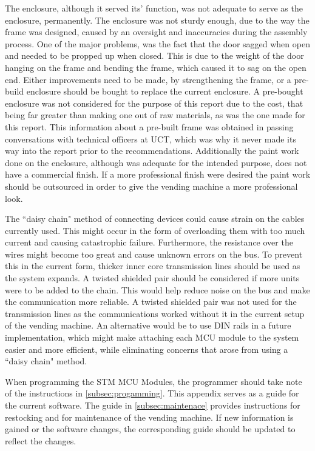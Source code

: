 \documentclass[a4paper,11pt]{article}
\numberwithin{figure}{section}
\numberwithin{table}{section}
\begin{document}
The enclosure, although it served its' function, was not adequate to serve as the enclosure, permanently. The enclosure was not sturdy enough, due to the way the frame was designed, caused by an oversight and inaccuracies during the assembly process. One of the major problems, was the fact that the door sagged when open and needed to be propped up when closed. This is due to the weight of the door hanging on the frame and bending the frame, which caused it to sag on the open end. Either improvements need to be made, by strengthening the frame, or a pre-build enclosure should be bought to replace the current enclosure. A pre-bought enclosure was not considered for the purpose of this report due to the cost, that being far greater than making one out of raw materials, as was the one made for this report. This information about a pre-built frame was obtained in passing conversations with technical officers at UCT, which was why it never made its way into the report prior to the recommendations. Additionally the paint work done on the enclosure, although was adequate for the intended purpose, does not have a commercial finish. If a more professional finish were desired the paint work should be outsourced in order to give the vending machine a more professional look.

The ``daisy chain" method of connecting devices could cause strain on the cables currently used. This might occur in the form of overloading them with too much current and causing catastrophic failure. Furthermore, the resistance over the wires might become too great and cause unknown errors on the bus. To prevent this in the current form, thicker inner core transmission lines should be used as the system expands. A twisted shielded pair should be considered if more units were to be added to the chain. This would help reduce noise on the bus and make the communication more reliable. A twisted shielded pair was not used for the transmission lines as the communications worked without it in the current setup of the vending machine. An alternative would be to use DIN rails in a future implementation, which might make attaching each MCU module to the system easier and more efficient, while eliminating concerns that arose from using a ``daisy chain" method.

When programming the STM MCU Modules, the programmer should take note of the instructions in \autoref{subsec:progamming}. This appendix serves as a guide for the current software. The guide in \autoref{subsec:maintenace} provides instructions for restocking and for maintenance of the vending machine. If new information is gained or the software changes, the corresponding guide should be updated to reflect the changes.
\end{document}
